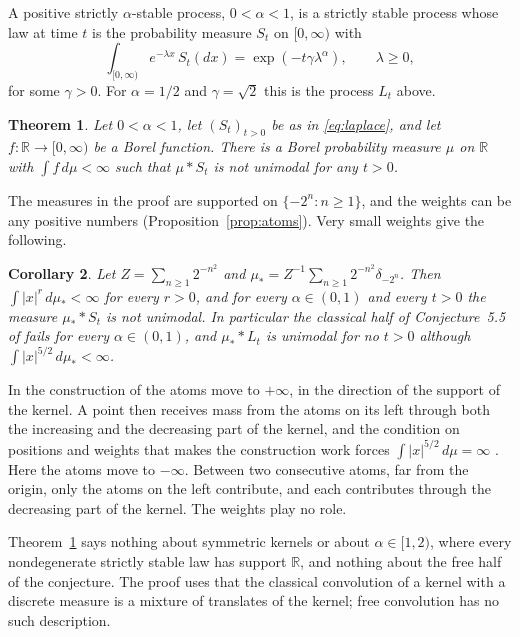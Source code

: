 \documentclass[11pt]{amsart}
\numberwithin{equation}{section}
\newtheorem{theorem}{Theorem}[section]
\newtheorem{corollary}[theorem]{Corollary}
\theoremstyle{definition}
\theoremstyle{remark}
\newcommand{\R}{\mathbb R}
\begin{document}
A positive strictly $\alpha$-stable process, $0<\alpha<1$, is a strictly stable process whose law at time $t$ is the probability measure $S_t$ on $[0,\infty)$ with
\begin{equation}\label{eq:laplace}
\int_{[0,\infty)}e^{-\lambda x}\,S_t(dx)=\exp(-t\gamma\lambda^{\alpha}),\qquad \lambda\ge0,
\end{equation}
for some $\gamma>0$. For $\alpha=1/2$ and $\gamma=\sqrt2$ this is the process $L_t$ above.

\begin{theorem}\label{thm:stable}
Let $0<\alpha<1$, let $(S_t)_{t>0}$ be as in \eqref{eq:laplace}, and let $f\colon\R\to[0,\infty)$ be a Borel function. There is a Borel probability measure $\mu$ on $\R$ with $\int f\,d\mu<\infty$ such that $\mu\ast S_t$ is not unimodal for any $t>0$.
\end{theorem}

The measures in the proof are supported on $\{-2^n:n\ge1\}$, and the weights can be any positive numbers (Proposition~\ref{prop:atoms}). Very small weights give the following.

\begin{corollary}\label{cor:moments}
Let $Z=\sum_{n\ge1}2^{-n^2}$ and $\mu_*=Z^{-1}\sum_{n\ge1}2^{-n^2}\delta_{-2^n}$. Then $\int|x|^r\,d\mu_*<\infty$ for every $r>0$, and for every $\alpha\in(0,1)$ and every $t>0$ the measure $\mu_*\ast S_t$ is not unimodal. In particular the classical half of Conjecture~5.5 of \cite{HU} fails for every $\alpha\in(0,1)$, and $\mu_*\ast L_t$ is unimodal for no $t>0$ although $\int|x|^{5/2}\,d\mu_*<\infty$.
\end{corollary}

In the construction of \cite[Section~5.2]{HU} the atoms move to $+\infty$, in the direction of the support of the kernel. A point then receives mass from the atoms on its left through both the increasing and the decreasing part of the kernel, and the condition on positions and weights that makes the construction work forces $\int|x|^{5/2}\,d\mu=\infty$ \cite[(5.45)]{HU}. Here the atoms move to $-\infty$. Between two consecutive atoms, far from the origin, only the atoms on the left contribute, and each contributes through the decreasing part of the kernel. The weights play no role.

Theorem~\ref{thm:stable} says nothing about symmetric kernels or about $\alpha\in[1,2)$, where every nondegenerate strictly stable law has support $\R$, and nothing about the free half of the conjecture. The proof uses that the classical convolution of a kernel with a discrete measure is a mixture of translates of the kernel; free convolution has no such description.
\end{document}
